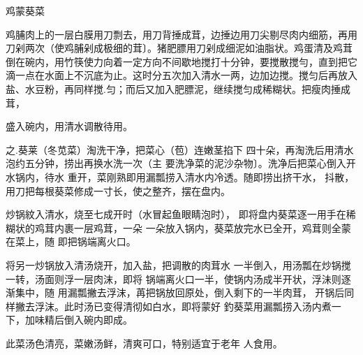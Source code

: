 \begin{recipe}{鸡蒙葵菜}

\ingredients


\cooking

\step 鸡脯肉上的一层白膜用刀剽去，用刀背捶成茸，边捶边用刀尖剔尽肉内细筋，再用刀剁两次（使鸡脯剁成极细的茸〕。猪肥膘用刀剁成细泥如油脂状。鸡蛋清及鸡茸倒在碗内，用竹筷使力向着一定方向不间歇地搅打十分钟，要搅散搅勻，直到把它滴一点在水面上不沉底为止。这时分五次加入清水一两，边加边搅。搅匀后再放入盐、水豆粉，再同样搅.匀；而后又加入肥膘泥，继续搅匀成稀糊状。把瘦肉捶成茸，

盛入碗内，用清水调散待用。

之.葵莱（冬苋菜）淘洗干净，把菜心（苞）连嫩茎掐下 四十朵，再淘洗后用清水泡约五分钟，捞出再换水洗一次（主 要洗净菜的泥沙杂物〕。洗净后把菜心倒入开水锅内，待水 重开，菜刚熟即用漏瓢捞入清水内冷透。随即捞出挤干水， 抖散，用刀把每根葵菜修成一寸长，使之整齐，摆在盘内。

炒锅紋入清水，烧至七成开时（水冒起鱼眼睛泡时）， 即将盘内葵菜逐一用手在稀糊状的鸡茸内裹一层鸡茸，一朵 一朵放入锅内，葵菜放完水已全开，鸡茸则全蒙在菜上，随 即把锅端离火口。

将另一炒锅放入清汤烧开，加入盐，把调散的肉茸水 一半倒入，用汤瓢在炒锅搅一转，汤面则浮一层肉沫，即将 锅端离火口一半，使锅内汤成半开状，浮沬则逐渐集中，随 用漏瓢撇去浮沫，苒把锅放回原处，倒入剩下的一半肉茸， 开锅后同样撇去浮沫。此时汤已变得清彻如白水，即将蒙好 釣葵菜用漏瓢捞入汤内煮一下，加味精后倒入碗内即成。

\notes

此菜汤色清亮，菜嫩汤鲜，清爽可口，特别适宜于老年 人食用。

\end{recipe}

